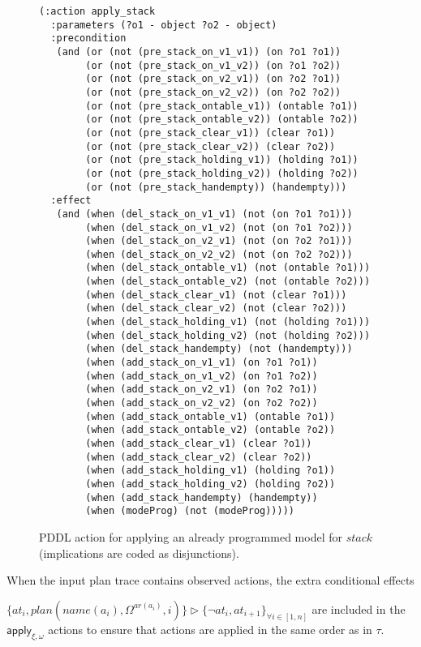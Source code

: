 \begin{itemize}
\begin{enumerate}
\begin{figure}[hbt!]
\begin{scriptsize}
\begin{verbatim}
(:action apply_stack
  :parameters (?o1 - object ?o2 - object)
  :precondition
   (and (or (not (pre_stack_on_v1_v1)) (on ?o1 ?o1))
        (or (not (pre_stack_on_v1_v2)) (on ?o1 ?o2))
        (or (not (pre_stack_on_v2_v1)) (on ?o2 ?o1))
        (or (not (pre_stack_on_v2_v2)) (on ?o2 ?o2))
        (or (not (pre_stack_ontable_v1)) (ontable ?o1))
        (or (not (pre_stack_ontable_v2)) (ontable ?o2))
        (or (not (pre_stack_clear_v1)) (clear ?o1))
        (or (not (pre_stack_clear_v2)) (clear ?o2))
        (or (not (pre_stack_holding_v1)) (holding ?o1))
        (or (not (pre_stack_holding_v2)) (holding ?o2))
        (or (not (pre_stack_handempty)) (handempty)))
  :effect
   (and (when (del_stack_on_v1_v1) (not (on ?o1 ?o1)))
        (when (del_stack_on_v1_v2) (not (on ?o1 ?o2)))
        (when (del_stack_on_v2_v1) (not (on ?o2 ?o1)))
        (when (del_stack_on_v2_v2) (not (on ?o2 ?o2)))
        (when (del_stack_ontable_v1) (not (ontable ?o1)))
        (when (del_stack_ontable_v2) (not (ontable ?o2)))
        (when (del_stack_clear_v1) (not (clear ?o1)))
        (when (del_stack_clear_v2) (not (clear ?o2)))
        (when (del_stack_holding_v1) (not (holding ?o1)))
        (when (del_stack_holding_v2) (not (holding ?o2)))
        (when (del_stack_handempty) (not (handempty)))
        (when (add_stack_on_v1_v1) (on ?o1 ?o1))
        (when (add_stack_on_v1_v2) (on ?o1 ?o2))
        (when (add_stack_on_v2_v1) (on ?o2 ?o1))
        (when (add_stack_on_v2_v2) (on ?o2 ?o2))
        (when (add_stack_ontable_v1) (ontable ?o1))
        (when (add_stack_ontable_v2) (ontable ?o2))
        (when (add_stack_clear_v1) (clear ?o1))
        (when (add_stack_clear_v2) (clear ?o2))
        (when (add_stack_holding_v1) (holding ?o1))
        (when (add_stack_holding_v2) (holding ?o2))
        (when (add_stack_handempty) (handempty))
        (when (modeProg) (not (modeProg)))))
\end{verbatim}
\end{scriptsize}
 \caption{\small PDDL action for applying an already programmed model for $stack$ (implications are coded as disjunctions).}
\label{fig:compilation}
\end{figure}


When the input plan trace contains observed actions, the extra conditional effects

$\{at_{i},plan(name(a_i),\Omega^{ar(a_i)},i)\}\rhd\{\neg at_{i},at_{i+1}\}_{\forall i\in [1,n]}$ are included in the $\mathsf{apply_{\xi,\omega}}$ actions to ensure that actions are applied in the same order as in $\tau$.\\


\end{enumerate}
\end{itemize}
